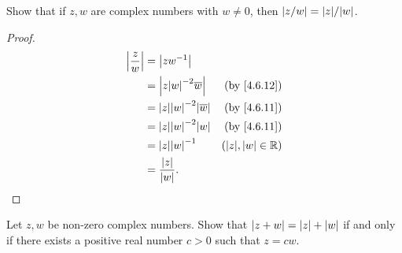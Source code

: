 \begin{ex}\label{ex:4.6.7}
  Show that if \(z, w\) are complex numbers with \(w \neq 0\), then \(\abs{z / w} = \abs{z} / \abs{w}\).
\end{ex}

\begin{proof}
  \begin{align*}
    \abs{\frac{z}{w}} & = \abs{z w^{-1}}                                                      \\
                      & = \abs{z \abs{w}^{-2} \overline{w}}       & \text{(by \cref{4.6.12})} \\
                      & = \abs{z} \abs{w}^{-2} \abs{\overline{w}} & \text{(by \cref{4.6.11})} \\
                      & = \abs{z} \abs{w}^{-2} \abs{w}            & \text{(by \cref{4.6.11})} \\
                      & = \abs{z} \abs{w}^{-1}                    & (\abs{z}, \abs{w} \in \R) \\
                      & = \frac{\abs{z}}{\abs{w}}.
  \end{align*}
\end{proof}

\begin{ex}\label{ex:4.6.8}
  Let \(z, w\) be non-zero complex numbers.
  Show that \(\left\lvert z + w\right\rvert = \left\lvert z\right\rvert + \left\lvert w\right\rvert\) if and only if there exists a positive real number \(c > 0\) such that \(z = cw\).
\end{ex}

